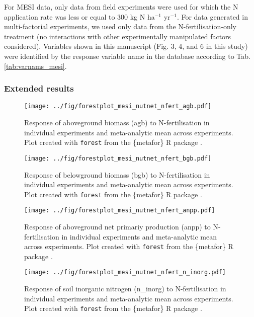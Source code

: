 \documentclass{myreport}
\begin{document}
For MESI data, only data from field experiments were used for which the N application rate was less or equal to 300 kg N ha$^{-1}$ yr$^{-1}$. For data generated in multi-factorial experiments, we used only data from the N-fertilisation-only treatment (no interactions with other experimentally manipulated factors considered). Variables shown in this manuscript (Fig. 3, 4, and 6 in this study) were identified by the response variable name in the database according to Tab. \ref{tab:varnams_mesi}.

\subsubsection{Extended results}

\begin{figure}[h]
\centering
\texttt{[image: ../fig/forestplot\_mesi\_nutnet\_nfert\_agb.pdf]}
\caption{Response of aboveground biomass (agb) to N-fertilisation in individual experiments and meta-analytic mean across experiments. Plot created with \texttt{forest} from the \{metafor\} R package \cite{viechtbauer_conducting_2010}.}
\end{figure}

\begin{figure}[h]
\centering
\texttt{[image: ../fig/forestplot\_mesi\_nutnet\_nfert\_bgb.pdf]}
\caption{Response of belowground biomass (bgb) to N-fertilisation in individual experiments and meta-analytic mean across experiments. Plot created with \texttt{forest} from the \{metafor\} R package \cite{viechtbauer_conducting_2010}.}
\end{figure}


\begin{figure}[h]
\centering
\texttt{[image: ../fig/forestplot\_mesi\_nutnet\_nfert\_anpp.pdf]}
\caption{Response of aboveground net primariy production (anpp) to N-fertilisation in individual experiments and meta-analytic mean across experiments. Plot created with \texttt{forest} from the \{metafor\} R package \cite{viechtbauer_conducting_2010}.}
\end{figure}

\begin{figure}[h]
\centering
\texttt{[image: ../fig/forestplot\_mesi\_nutnet\_nfert\_n\_inorg.pdf]}
\caption{Response of soil inorganic nitrogen (n\_inorg) to N-fertilisation in individual experiments and meta-analytic mean across experiments. Plot created with \texttt{forest} from the \{metafor\} R package \cite{viechtbauer_conducting_2010}.}
\end{figure}
\end{document}
